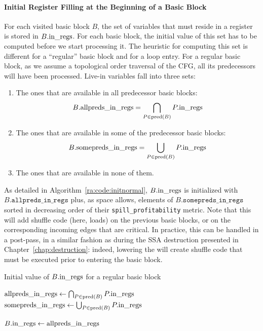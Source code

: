 {\paragraph{Initial Register Filling at the Beginning of a Basic Block}
For each visited basic block $B$, the set of variables that must reside in a register is stored in $B.\textrm{in\_regs}$.
For each basic block, the initial value of this set has to be computed before we start processing it.
The heuristic for computing this set is different for a ``regular'' basic block and for a loop entry.
For a regular basic block, as we assume a topological order traversal of the CFG, all its predecessors will have been processed.
Live-in variables fall into three sets:
\begin{enumerate}
\item The ones that are available in all predecessor basic blocks:
  $$B.\textrm{allpreds\_in\_regs}=\bigcap_{P\in \textrm{pred}(B)} P.\textrm{in\_regs}$$
\item The ones that are available in some of the predecessor basic blocks:
  $$B.\textrm{somepreds\_in\_regs}=\bigcup_{P\in \textrm{pred}(B)} P.\textrm{in\_regs}$$
\item The ones that are available in none of them.
\end{enumerate}

As detailed in Algorithm~\ref{ra:code:initnormal}, $B.\textrm{in\_regs}$ is initialized with $B.\texttt{allpreds\_in\_regs}$ plus, as space allows, elements of $B.\texttt{somepreds\_in\_regs}$ sorted in decreasing order of their \texttt{spill\_profitability} metric.
Note that this will add shuffle code (here, loads) on the previous basic blocks, or on the corresponding incoming edges that are critical.
In practice, this can be handled in a post-pass, in a similar fashion as during the SSA destruction presented in Chapter~\ref{chap:destruction}: indeed, lowering the \phifuns will create shuffle code that must be executed prior to entering the basic block.


\begin{algorithm}[h]
\caption{Initial value of $B.\textrm{in\_regs}$ for a regular basic block}
\label{ra:code:initnormal}

  $\textrm{allpreds\_in\_regs} \gets \bigcap_{P\in \textrm{pred}(B)} P.\textrm{in\_regs}$\;
  $\textrm{somepreds\_in\_regs} \gets \bigcup_{P\in \textrm{pred}(B)} P.\textrm{in\_regs}$\;

  $B.\textrm{in\_regs} \gets \textrm{allpreds\_in\_regs}$\;
\end{algorithm}


}
